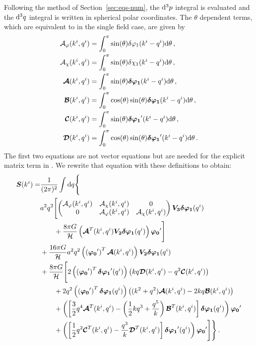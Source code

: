 Following the method of Section~\ref{sec:eqs-num}, the $\mathrm{d}^3p$ integral is evaluated
and the $\mathrm{d}^3 q$ integral is written in spherical polar coordinates. The $\theta$
dependent terms, which are equivalent to  in the single field case,
are given by
% 
\begin{align}
\label{eq:AtoD-vectors-res}
 \mathcal{A}_{\varphi}(k^i,q^i) &= \int_0^\pi \sin(\theta) \delta\varphi_{1}(k^i-q^i) \mathrm{d}\theta \,,
\nonumber \\
 \mathcal{A}_\chi(k^i,q^i) &= \int_0^\pi \sin(\theta) \delta \chi_1(k^i-q^i) \mathrm{d}\theta \,,
\nonumber\\
 \boldsymbol{\mathcal{A}}(k^i,q^i) &= \int_0^\pi \sin(\theta) \boldsymbol{\delta\varphi_{1}}(k^i-q^i) \mathrm{d}\theta \,,
\nonumber\\
 \boldsymbol{\mathcal{B}}(k^i,q^i) &= \int_0^\pi \cos(\theta)\sin(\theta) \boldsymbol{\delta\varphi_{1}}(k^i-q^i)
\mathrm{d}\theta \,,\nonumber\\
 \boldsymbol{\mathcal{C}}(k^i,q^i) &= \int_0^\pi \sin(\theta) \boldsymbol{\delta\varphi_{1}}'(k^i-q^i) \mathrm{d}\theta \,,
\nonumber\\
 \boldsymbol{\mathcal{D}}(k^i,q^i) &= \int_0^\pi \cos(\theta) \sin(\theta) \boldsymbol{\delta\varphi_{1}}'(k^i-q^i)
\mathrm{d}\theta \,.
\end{align}
% 
The first two equations are not vector equations but are needed for the explicit
matrix term in . We rewrite that equation with these
definitions to obtain:
% 
\begin{align}
 \bm{S}(\kvi) = &\frac{1}{(2\pi)^2}\int\d q \Bigg\{ \nonumber \\
% 
&a^2 q^2\Biggl[ \begin{pmatrix}
                 \A_\vp(\kvi,\qvi) & \A_\chi(\kvi,\qvi) & 0 \\
		 0                 & \A_\vp(\kvi, \qvi) & \A_\chi(\kvi, \qvi)
                \end{pmatrix}
		\bm{V_3} \bm{\dvp1}(\qvi) \nonumber \\
& \qquad +\frac{8\pi G}{\H} \left( \bm{\A}^T(\kvi,\qvi) \bm{V_2}
\bm{\dvp1}(\qvi)\right) \bm{\vp_0}'
	\Biggr] \nonumber \\
% 
&+ \frac{16\pi G}{\H}a^2 q^2 \left( \left(\bm{\vp_0}'\right)^T \bm{\A}(\kvi,\qvi) \right)
	\bm{V_2}\bm{\dvp1}(\qvi) \nonumber \\
% 
&+ \frac{8\pi G}{\H} \Bigg[ 2\left( \left(\bm{\vp_0}'\right)^T \bm{\dvp1}'(\qvi) \right)
	\left( kq \bm{\D}(\kvi,\qvi) - q^2 \bm{\C}(\kvi, \qvi) \right) \nonumber \\
% 
&\qquad +2q^2 \left( \left(\bm{\vp_0}'\right)^T \bm{\dvp1}(\qvi) \right)
	\left( (k^2 + q^2)\bm{\A}(\kvi,\qvi) - 2kq\bm{\B}(\kvi, \qvi) \right)\notag\\
% 
&\qquad + \left(\left[ \frac{3}{2}q^4 \bm{\A}^T(\kvi,\qvi) 
	- \left( \frac{1}{2}kq^3 + \frac{q^5}{k}\right) \bm{\B}^T(\kvi,\qvi)
	\right] \bm{\dvp1}(\qvi) \right) \bm{\vp_0}' \nonumber \\
% 
&\qquad + \left(\left[ \frac{1}{2}q^2 \bm{\C}^T(\kvi,\qvi) 
	- \frac{q^3}{k} \bm{\D}^T(\kvi,\qvi)
	\right] \bm{\dvp1}'(\qvi) \right) \bm{\vp_0}' \Bigg] \Bigg\} \,.
\end{align}
